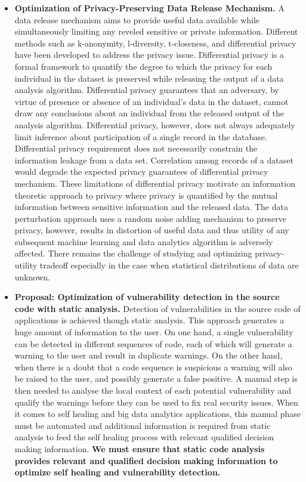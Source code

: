 \documentclass[a4paper,11pt]{article}
\begin{document}
\begin{itemize}
\item \textbf{Optimization of Privacy-Preserving Data Release Mechanism.} A data release mechanism aims to provide useful data available while simultaneously limiting any reveled sensitive or private information. Different methods such as k-anonymity, l-diversity, t-closeness, and differential privacy have been developed to address the privacy issue. Differential privacy is a formal framework to quantify the degree to which the privacy for each individual in the dataset is preserved while releasing the output of a data analysis algorithm. Differential privacy guarantees that an adversary, by virtue of presence or absence of an individual's data in the dataset, cannot draw any conclusions about an individual from the released output of the analysis algorithm. Differential privacy, however, does not always adequately limit inference about participation of a single record in the database. Differential privacy requirement does not necessarily constrain the information leakage from a data set. Correlation among records of a dataset would degrade the expected privacy guarantees of differential privacy mechanism. These limitations of differential privacy motivate an information theoretic approach to privacy where privacy is quantified by the mutual information between sensitive information and the released data. The data perturbation approach uses a random noise adding mechanism to preserve privacy, however, results in distortion of useful data and thus utility of any subsequent machine learning and data analytics algorithm is adversely affected. There remains the challenge of studying and optimizing privacy-utility tradeoff especially in the case when statistical distributions of data are unknown. 

\item {\color{blue} \textbf{\YAGshort{} Proposal: Optimization of vulnerability detection in the source code with static analysis.}} Detection of vulnerabilities in the source code of applications is achieved though static analysis. This approach generates a huge amount of information to the user. On one hand, a single vulnerability can be detected in different sequences of code, each of which will generate a warning to the user and result in duplicate warnings. On the other hand, when there is a doubt that a code sequence is suspicious a warning will also be raised to the user, and possibly generate a false positive. A manual step is then needed to analyse the local context of each potential vulnerability and qualify the warnings before they can be used to fix real security issues. When it comes to self healing and big data analytics applications, this manual phase must be automated and additional information is required from static analysis to feed the self healing process with relevant qualified decision making information.
\textbf{We must ensure that static code analysis provides relevant and qualified decision making information to optimize self healing and vulnerability detection.} 

\end{itemize}
\end{document}
